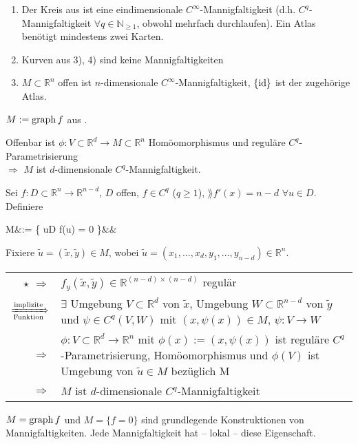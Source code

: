 \begin{example}
	\begin{enumerate}[label={\arabic*)}]
		\item Der Kreis aus  ist eine eindimensionale $C^{\infty}$-Mannigfaltigkeit (d.h. $C^q$-Mannigfaltigkeit $\forall q \in \mathbb{N}_{\ge 1}$, obwohl mehrfach durchlaufen). Ein Atlas benötigt mindestens zwei Karten.
		\item Kurven aus  3), 4) sind keine Mannigfaltigkeiten
		\item $M\subset \mathbb{R}^n$ offen ist $n$-dimensionale $C^\infty$-Mannigfaltigkeit, $\{ \operatorname{id} \}$ ist der zugehörige Atlas.
	\end{enumerate}
\end{example}

\begin{example}
	$M:= \operatorname{graph} f$ aus .
	
	Offenbar ist $\phi\colon V\subset \mathbb{R}^d\to M\subset \mathbb{R}^n$ Homöomorphismus und reguläre $C^q$-Parametrisierung\\
	 $\Rightarrow$ $M$ ist $d$-dimensionale $C^q$-Mannigfaltigkeit.
\end{example}

\begin{example}
	Sei $f\colon D\subset \mathbb{R}^n\to \mathbb{R}^{n-d}$, $D$ offen, $f\in C^q$ ($q\ge 1$), $\rang f'(x) = n-d$ $\forall u\in D$. Definiere \begin{flalign} \tag{\star} M&:= \{ u\in D \mid f(u) = 0 \}&&\end{flalign}
	
	Fixiere $\tilde{u} = (\tilde{x}, \tilde{y})\in M$, wobei $\tilde{u	} = (x_1, \dotsc, x_d, y_1, \dotsc, y_{n-d})\in \mathbb{R}^n$.
	
	\begin{tabularx}{\linewidth}{r@{\ }X}
		$\star$ $\Rightarrow$ & $f_y(\tilde{x}, \tilde{y})\in \mathbb{R}^{(n-d)\times(n-d)}$ regulär \\
		$\xRightarrow[\text{Funktion}]{\text{implizite}}$ & $\exists$ Umgebung $V\subset \mathbb{R}^d$ von $\tilde{x}$, Umgebung $W\subset \mathbb{R}^{n-d}$ von $\tilde{y}$ und $\psi \in C^q(V,W)$ mit $(x, \psi(x))\in M$, $\psi\colon V\to W$ \\
		$\Rightarrow$ & $\phi\colon V\subset \mathbb{R}^d \to \mathbb{R}^n$ mit $\phi(x) := (x, \psi(x))$ ist reguläre $C^q$-Parametrisierung, Homöomorphismus und $\phi(V)$ ist Umgebung von $\tilde{u} \in M$ bezüglich M \\
		$\Rightarrow$ & $M$ ist $d$-dimensionale $C^q$-Mannigfaltigkeit
	\end{tabularx}
\end{example}
\begin{underlinedenvironment}[Bemerkung]
	$M = \operatorname{graph} f$ und $M=\{f=0\}$ sind grundlegende Konstruktionen von Mannigfaltigkeiten. Jede Mannigfaltigkeit hat -- lokal -- diese Eigenschaft.
\end{underlinedenvironment}

